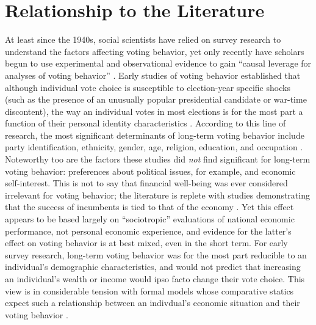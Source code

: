 \section{Relationship to the Literature}
At least since the 1940s, social scientists have relied on survey research to understand the factors affecting voting behavior, yet only recently have scholars begun to use experimental and observational evidence to gain ``causal leverage for analyses of voting behavior'' \parencite{Bartels2010}. Early studies of voting behavior established that although individual vote choice is susceptible to election-year specific shocks (such as the presence of an unusually popular presidential candidate or war-time discontent), the way an individual votes in most elections is for the most part a function of their personal identity characteristics \parencite{Converse1966}. According to this line of research, the most significant determinants of long-term voting behavior include party identification, ethnicity, gender, age, religion, education, and occupation \parencite{Lazarsfeld1948,Berelson1954,Campbell1960,Stanley2006a}. Noteworthy too are the factors these studies did \textit{not} find significant for long-term voting behavior: preferences about political issues, for example, and economic self-interest. This is not to say that financial well-being was ever considered irrelevant for voting behavior; the literature is replete with studies demonstrating that the success of incumbents is tied to that of the economy \parencite{Tufte1975,Meltzer1975,Hibbs1987}. Yet this effect appears to be based largely on ``sociotropic'' evaluations of national economic performance, not personal economic experience, and evidence for the latter's effect on voting behavior is at best mixed, even in the short term\parencite{Linn2010}.  For early survey research, long-term voting behavior was for the most part reducible to an individual's demographic characteristics, and would not predict that increasing an individual's wealth or income would ipso facto change their vote choice.  This view is in considerable tension with formal models whose comparative statics expect such a relationship between an indivdual's economic situation and their voting behavior \parencite[e.g.,][]{Romer1975,Roberts1977,Meltzer1981}.

